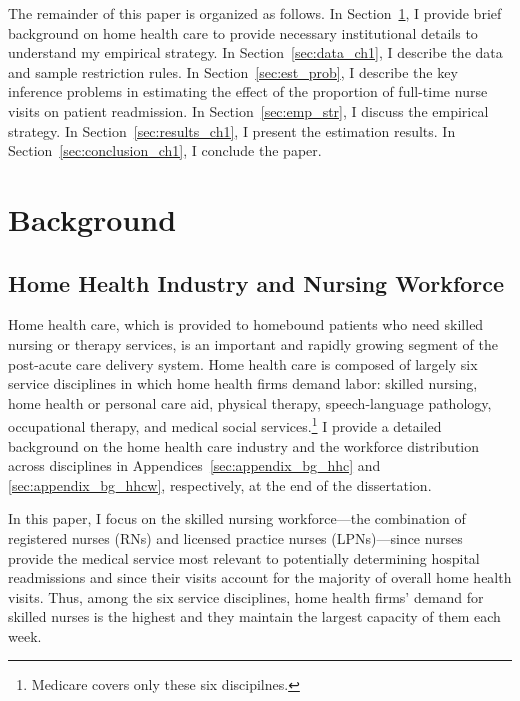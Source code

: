 \documentclass[final,12pt]{article}
\begin{document}
The remainder of this paper is organized as follows.
In Section~\ref{sec:background_ch1}, I provide brief background on home health care to provide necessary institutional details to understand my empirical strategy.  %
In Section~\ref{sec:data_ch1}, I describe the data and sample restriction rules.
In Section~\ref{sec:est_prob}, I describe the key inference problems in estimating the effect of the proportion of full-time nurse visits on patient readmission.
In Section~\ref{sec:emp_str}, I discuss the empirical strategy.
In Section~\ref{sec:results_ch1}, I present the estimation results.
In Section~\ref{sec:conclusion_ch1}, I conclude the paper.


\section{Background} \label{sec:background_ch1}

\subsection{Home Health Industry and Nursing Workforce} \label{sec:bg_hh_nurse}

Home health care, which is provided to homebound patients who need skilled nursing or therapy services, is an important and rapidly growing segment of the post-acute care delivery system.
Home health care is composed of largely six service disciplines in which home health firms demand labor: skilled nursing, home health or personal care aid, physical therapy, speech-language pathology, occupational therapy, and medical social services.\footnote{Medicare covers only these six discipilnes.}
I provide a detailed background on the home health care industry and the workforce distribution across disciplines in Appendices~\ref{sec:appendix_bg_hhc} and \ref{sec:appendix_bg_hhcw}, respectively, at the end of the dissertation.

In this paper, I focus on the skilled nursing workforce---the combination of registered nurses (RNs) and licensed practice nurses (LPNs)---since nurses provide the medical service most relevant to potentially determining hospital readmissions and since their visits account for the majority of overall home health visits.
Thus, among the six service disciplines, home health firms' demand for skilled nurses is the highest and they maintain the largest capacity of them each week.
\end{document}
